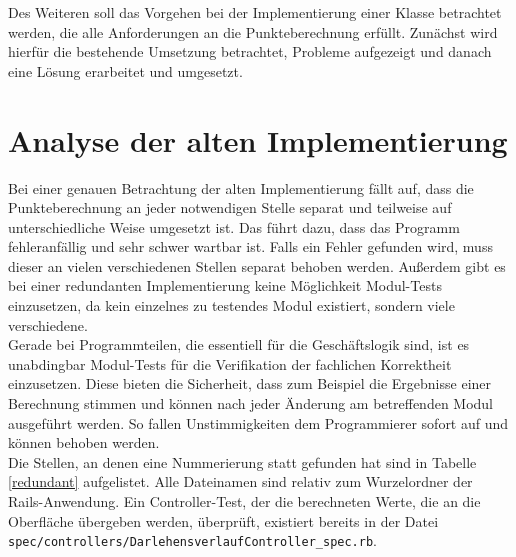 \documentclass[12pt]{scrreprt}
\begin{document}
Des Weiteren soll das Vorgehen bei der Implementierung einer Klasse betrachtet werden, die alle Anforderungen an die Punkteberechnung erfüllt. Zunächst wird hierfür die bestehende Umsetzung betrachtet, Probleme aufgezeigt und danach eine Lösung erarbeitet und umgesetzt.

\newpage

\section{Analyse der alten Implementierung}
Bei einer genauen Betrachtung der alten Implementierung fällt auf, dass die Punkteberechnung an jeder notwendigen Stelle separat und teilweise auf unterschiedliche Weise umgesetzt ist. Das führt dazu, dass das Programm fehleranfällig und sehr schwer wartbar ist. Falls ein Fehler gefunden wird, muss dieser an vielen verschiedenen Stellen separat behoben werden. Außerdem gibt es bei einer redundanten Implementierung keine Möglichkeit Modul-Tests einzusetzen, da kein einzelnes zu testendes Modul existiert, sondern viele verschiedene. \\

Gerade bei Programmteilen, die essentiell für die Geschäftslogik sind, ist es unabdingbar Modul-Tests für die Verifikation der fachlichen Korrektheit einzusetzen. Diese bieten die Sicherheit, dass zum Beispiel die Ergebnisse einer Berechnung stimmen und können nach jeder Änderung am betreffenden Modul ausgeführt werden. So fallen Unstimmigkeiten dem Programmierer sofort auf und können behoben werden. \\ 

Die Stellen, an denen eine Nummerierung statt gefunden hat sind in Tabelle \ref{redundant} aufgelistet. Alle Dateinamen sind relativ zum Wurzelordner der Rails-Anwendung. Ein Controller-Test, der die berechneten Werte, die an die Oberfläche übergeben werden, überprüft, existiert bereits in der Datei 
\newline \verb+spec/controllers/DarlehensverlaufController_spec.rb+.
\end{document}

